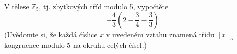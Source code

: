 V tělese $\mathbb{Z}_{5}$, tj. zbytkových tříd modulo 5, vypočtěte
$$-\frac{4}{3}\left ( 2-\frac{3}{4} -\frac{3}{3}\right )$$
(Uvědomte si, že každá číslice $x$ v uvedeném vztahu znamená třídu $\left [ x
\right ]_{5}$ kongruence modulo 5 na okruhu celých čísel.)
